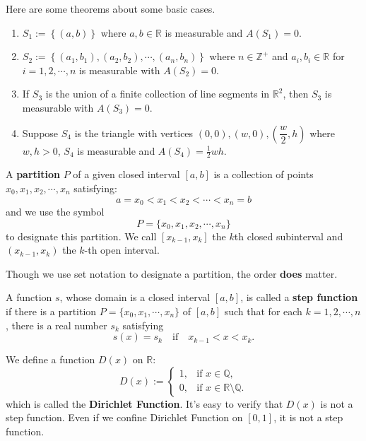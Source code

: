 	\begin{theoremenv} Here are some theorems about some basic cases.
		\begin{enumerate}
			\item $S_1:=\left\{ (a,b)\right\} $ where $a,b\in \mathbb{R}$ is measurable and $A(S_1)=0$.
			\item $S_2:=\left\{ (a_1,b_1),(a_2,b_2),\cdots,(a_n,b_n)\right\}$ where $n\in \mathbb{Z}^+$ and $a_i,b_i\in \mathbb{R}$ for $i=1,2,\cdots, n$ is measurable with $A(S_2)=0$.
			\item If $S_3$ is the union of a finite collection of line segments in $\mathbb{R}^2$, then $S_3$ is measurable with $A(S_3)=0$.
			\item Suppose $S_4$ is the triangle with vertices $(0,0),(w,0),(\dfrac{w}{2},h)$ where $w,h>0$, $S_4$ is measurable and $\displaystyle A(S_4)=\frac{1}{2}wh$.
		\end{enumerate}
	\end{theoremenv}
	\begin{definitionenv}
		A \textbf{partition} $P$ of a given closed interval $[a,b]$ is a collection of points $x_0,x_1,x_2,\cdots,x_{n}$ satisfying:
		\[
		a=x_0<x_1<x_2<\cdots<x_n=b
		\]
		and we use the symbol
		\[
		P=\{x_0,x_1,x_2,\cdots,x_{n}\}
		\]
		to designate this partition. We call $[x_{k-1},x_k]$ the $k$th closed subinterval and $(x_{k-1},x_k)$ the $k$-th open interval.
	\end{definitionenv}
	\begin{remarkenv}
		Though we use set notation to designate a partition, the order \textbf{does} matter.
	\end{remarkenv}
	\begin{definitionenv}
		A function $s$, whose domain is a closed interval $[a,b]$, is called a \textbf{step function} if there is a partition $P=\{x_0,x_1,\cdots,x_n\}$ of $[a,b]$ such that for each $k=1,2,\cdots,n$, there is a real number $s_k$ satisfying
		\[
		s(x)=s_k \quad \text{if} \quad x_{k-1}<x<x_k.
		\]
	\end{definitionenv}
	\begin{exampleenv}
		We define a function $D(x)$ on $\mathbb{R}$:
		\[
		D(x):=
		\begin{cases}
			1, & \text{if } x \in \mathbb{Q}, \\[4pt]
			0, & \text{if } x \in \mathbb{R} \setminus \mathbb{Q}.
		\end{cases}
		\]
		which is called the \textbf{Dirichlet Function}. It's easy to verify that $D(x)$ is not a step function. Even if we confine Dirichlet Function on $[0,1]$, it is not a step function.
	\end{exampleenv}
